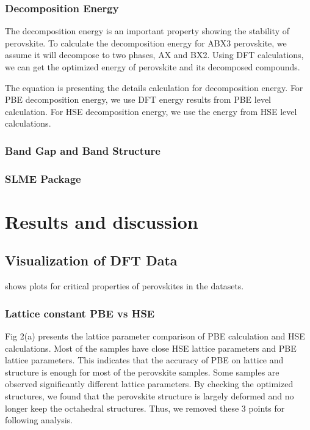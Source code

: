 \documentclass[twoside,twocolumn,9pt]{article}
\begin{document}
\subsubsection*{Decomposition Energy}
The decomposition energy is an important property showing the
stability of perovskite. To calculate the decomposition energy for
ABX3 perovskite, we assume it will decompose to two phases, AX and
BX2. Using DFT calculations, we can get the optimized energy of
perovskite and its decomposed compounds.


The equation is presenting the details calculation for decomposition
energy. For PBE decomposition energy, we use DFT energy results from
PBE level calculation. For HSE decomposition energy, we use the energy
from HSE level calculations.

\subsubsection*{Band Gap and Band Structure}

\subsubsection*{SLME Package}


\newpage


\section*{Results and discussion}

\subsection*{Visualization of DFT Data}

shows plots for critical properties of perovskites in the datasets.

\subsubsection*{Lattice constant PBE vs HSE}
Fig 2(a) presents the lattice parameter comparison of PBE calculation
and HSE calculations. Most of the samples have close HSE lattice
parameters and PBE lattice parameters. This indicates that the
accuracy of PBE on lattice and structure is enough for most of the
perovskite samples. Some samples are observed significantly different
lattice parameters. By checking the optimized structures, we found
that the perovskite structure is largely deformed and no longer keep
the octahedral structures. Thus, we removed these 3 points for
following analysis.
\end{document}
